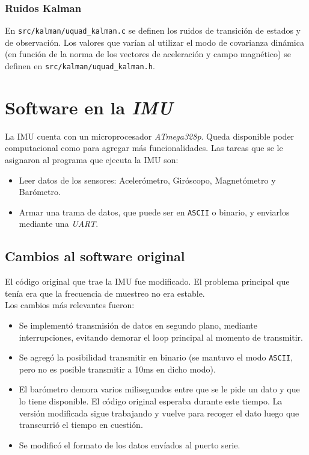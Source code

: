 \documentclass[main]{subfiles}
\begin{document}
\subsubsection{Ruidos Kalman}
\label{sec:software:config-kalman}

En \verb+src/kalman/uquad_kalman.c+ se definen los ruidos de transici\'on de estados y de observaci\'on. Los valores que var\'ian al utilizar el modo de covarianza din\'amica (en funci\'on de la norma de los vectores de aceleraci\'on y campo magn\'etico) se definen en \verb+src/kalman/uquad_kalman.h+.

\section{Software en la \textit{IMU}}
\label{sec:software:mongoose}

La IMU cuenta con un microprocesador \textit{ATmega328p}. Queda disponible poder computacional como para agregar m\'as funcionalidades. Las tareas que se le asignaron al programa que ejecuta la IMU son:
\begin{itemize}
\item Leer datos de los sensores: Aceler\'ometro, Gir\'oscopo, Magnet\'ometro y Bar\'ometro.
\item Armar una trama de datos, que puede ser en \verb+ASCII+ o binario, y enviarlos mediante una \textit{UART}.
\end{itemize}

\subsection{Cambios al software original}
\label{sec:software:cambios-al-software-original}

El código original que trae la IMU fue modificado. El problema principal que ten\'ia era que la frecuencia de muestreo no era estable.\\

Los cambios m\'as relevantes fueron:
\begin{itemize}
\item Se implementó transmisión de datos en segundo plano, mediante interrupciones, evitando demorar el loop principal al momento de transmitir.
\item Se agregó la posibilidad transmitir en binario (se mantuvo el modo \verb+ASCII+, pero no es posible transmitir a 10ms en dicho modo).
\item El barómetro demora varios milisegundos entre que se le pide un dato y que lo tiene disponible. El código original esperaba durante este tiempo. La versión modificada sigue trabajando y vuelve para recoger el dato luego que transcurrió el tiempo en cuestión.
\item Se modificó el formato de los datos envíados al puerto serie.
\end{itemize}

\end{document}
